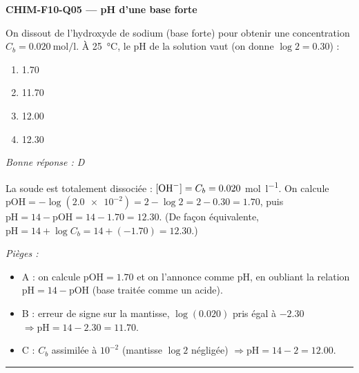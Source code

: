 \documentclass[11pt,a4paper]{article}
\begin{document}
\noindent\textbf{CHIM-F10-Q05 --- pH d'une base forte}\par
On dissout de l'hydroxyde de sodium  (base forte) pour obtenir une concentration $C_b = \qty{0.020}{\mol\per\litre}$. À \qty{25}{\celsius}, le pH de la solution vaut (on donne $\log 2 = \num{0.30}$) :
\begin{enumerate}[label=\Alph*)]
\item \num{1.70}
\item \num{11.70}
\item \num{12.00}
\item \num{12.30}
\end{enumerate}
\textit{Bonne réponse : D}\par
La soude est totalement dissociée : $[\ce{OH-}] = C_b = \num{0.020}$ \si{\mol\per\litre}. On calcule $\mathrm{pOH} = -\log(\num{2.0e-2}) = 2 - \log 2 = 2 - \num{0.30} = \num{1.70}$, puis $\mathrm{pH} = 14 - \mathrm{pOH} = 14 - \num{1.70} = \num{12.30}$. (De façon équivalente, $\mathrm{pH} = 14 + \log C_b = 14 + (\num{-1.70}) = \num{12.30}$.)\par
\textit{Pièges :}
\begin{itemize}
\item A : on calcule $\mathrm{pOH} = \num{1.70}$ et on l'annonce comme pH, en oubliant la relation $\mathrm{pH} = 14 - \mathrm{pOH}$ (base traitée comme un acide).
\item B : erreur de signe sur la mantisse, $\log(\num{0.020})$ pris égal à $\num{-2.30}$ $\Rightarrow \mathrm{pH} = 14 - \num{2.30} = \num{11.70}$.
\item C : $C_b$ assimilée à $10^{-2}$ (mantisse $\log 2$ négligée) $\Rightarrow \mathrm{pH} = 14 - 2 = \num{12.00}$.
\end{itemize}
\vspace{6pt}\hrule\vspace{8pt}
\end{document}
